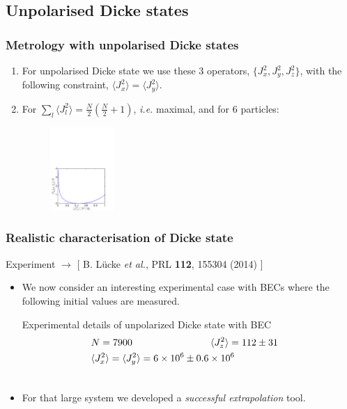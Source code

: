 \documentclass{beamer}
\newcommand{\expect}[1]{\ensuremath{\langle #1 \rangle}}
\newcommand{\citate}[1]{{\footnotesize{\color{gray}[ #1 ]}}

	}
\def\bea{\begin{eqnarray}}
\def\eea{\end{eqnarray}}
\def\nnnl{\nonumber\\}
\begin{document}
	\subsection{Unpolarised Dicke states}

		\begin{frame}
			\frametitle{Metrology with unpolarised Dicke states}
			\begin{enumerate}
				\item<1-> For unpolarised Dicke state we use these 3 operators, $\{J_x^2,J_y^2,J_z^2\}$, with the following constraint, $\expect{J_x^2}=\expect{J_y^2}$.
				\item<2-> For $\sum_l \expect{J_l^2} = \tfrac{N}{2} (\tfrac{N}{2}+1)$, {\it i.e.} maximal, and for 6 particles:
				\begin{figure}
					\includegraphics[height=120px]{img/upperboundary-dicke.pdf}
				\end{figure}

			\end{enumerate}

		\end{frame}

		\begin{frame}
			\frametitle{Realistic characterisation of Dicke state}
			{\small Experiment $\rightarrow$}
			\citate{B. L\"ucke {\it et al.}, PRL \textbf{112}, 155304 (2014)}

			\begin{itemize}
				\item We now consider an interesting experimental case with BECs where the following initial values are measured.
				\begin{block}{Experimental details of unpolarized Dicke state with BEC}
					\vspace{-1px}
					\bea
					 	&N = 7900 \hspace{80px} \expect{J_z^2}=112\pm 31 &\nnnl
						&\expect{J_x^2}=\expect{J_y^2}  =  6 \times 10^6 \pm 0.6\times 10^6 &\nnnl
						\nonumber
					\eea
				\end{block}

				\item For that large system we developed a \emph{\color{blue}successful extrapolation} tool.
			\end{itemize}
		\end{frame}
\end{document}
